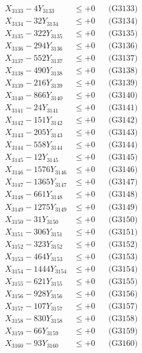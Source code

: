 \documentclass[a4paper,10pt]{article}
\begin{document}
{\begin{align}
X_{3133} - 4Y_{3133} &\leq +0 && \text{(G3133)} \\
X_{3134} - 32Y_{3134} &\leq +0 && \text{(G3134)} \\
X_{3135} - 322Y_{3135} &\leq +0 && \text{(G3135)} \\
X_{3136} - 294Y_{3136} &\leq +0 && \text{(G3136)} \\
X_{3137} - 552Y_{3137} &\leq +0 && \text{(G3137)} \\
X_{3138} - 490Y_{3138} &\leq +0 && \text{(G3138)} \\
X_{3139} - 216Y_{3139} &\leq +0 && \text{(G3139)} \\
X_{3140} - 866Y_{3140} &\leq +0 && \text{(G3140)} \\
\allowbreak
X_{3141} - 24Y_{3141} &\leq +0 && \text{(G3141)} \\
X_{3142} - 151Y_{3142} &\leq +0 && \text{(G3142)} \\
X_{3143} - 205Y_{3143} &\leq +0 && \text{(G3143)} \\
X_{3144} - 558Y_{3144} &\leq +0 && \text{(G3144)} \\
X_{3145} - 12Y_{3145} &\leq +0 && \text{(G3145)} \\
X_{3146} - 1576Y_{3146} &\leq +0 && \text{(G3146)} \\
X_{3147} - 1365Y_{3147} &\leq +0 && \text{(G3147)} \\
X_{3148} - 661Y_{3148} &\leq +0 && \text{(G3148)} \\
X_{3149} - 1275Y_{3149} &\leq +0 && \text{(G3149)} \\
X_{3150} - 31Y_{3150} &\leq +0 && \text{(G3150)} \\
\allowbreak
X_{3151} - 306Y_{3151} &\leq +0 && \text{(G3151)} \\
X_{3152} - 323Y_{3152} &\leq +0 && \text{(G3152)} \\
X_{3153} - 464Y_{3153} &\leq +0 && \text{(G3153)} \\
X_{3154} - 1444Y_{3154} &\leq +0 && \text{(G3154)} \\
X_{3155} - 621Y_{3155} &\leq +0 && \text{(G3155)} \\
X_{3156} - 928Y_{3156} &\leq +0 && \text{(G3156)} \\
X_{3157} - 107Y_{3157} &\leq +0 && \text{(G3157)} \\
X_{3158} - 830Y_{3158} &\leq +0 && \text{(G3158)} \\
X_{3159} - 66Y_{3159} &\leq +0 && \text{(G3159)} \\
X_{3160} - 93Y_{3160} &\leq +0 && \text{(G3160)} \\

\end{align}}
\end{document}
